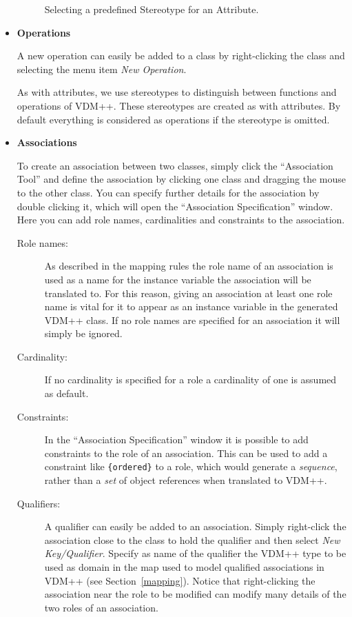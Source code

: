 \documentclass[\pformat,12pt]{article}
\newcommand{\vdmpp}{VDM++}
\begin{document}
\begin{itemize}
\begin{figure}[htb]
\begin{center}
\mbox{}
\caption{Selecting a predefined Stereotype for an Attribute.\label{fig:stereotype}}
\end{center}
\end{figure}

\item {\bf Operations}
  
  A new operation can easily be added to a class by right-clicking the
  class and selecting the menu item {\it New Operation}.

As with attributes, we use stereotypes to distinguish between
functions and operations of \vdmpp{}. These stereotypes are created as
with attributes. By default everything is considered as operations if the
stereotype is omitted.

\item{\bf Associations}
  
To create an association between two classes, simply click the ``Association Tool'' and   
define the association by clicking one class and dragging the mouse to the other class.   
You can specify further details for the association by double clicking it, which will open   
the ``Association Specification'' window. Here you can add role names, cardinalities and   
constraints to the association.  


\begin{description}
\item [Role names:] As described in the mapping rules the role name of an association is used as   
a name for the instance variable the association will be translated to. For this reason,   
giving an association at least one role name is vital for it to appear as an instance   
variable in the generated \vdmpp{} class. If no role names are specified for an association it   
will simply be ignored.  
\item [Cardinality:] If no cardinality is specified for a role a cardinality of one is assumed as   
default.  
\item [Constraints:] In the ``Association Specification'' window it is
  possible to add constraints to the role of an association. This
  can be used to add a constraint like {\tt \{ordered\}} to a role,
  which would generate a {\it sequence}, rather than a {\it set} of
  object references when translated to \vdmpp{}.
\item [Qualifiers:] A qualifier can easily be added to an association.
  Simply right-click the association close to the class to hold the
  qualifier and then select {\em New Key/Qualifier}. Specify as name of
  the qualifier the \vdmpp{} type to be used as domain in the map used
  to model qualified associations in \vdmpp{} (see
  Section~\ref{mapping}).  Notice that right-clicking the association
  near the role to be modified can modify many details of the two
  roles of an association.
\end{description}  
\end{itemize}
  
\end{document}
